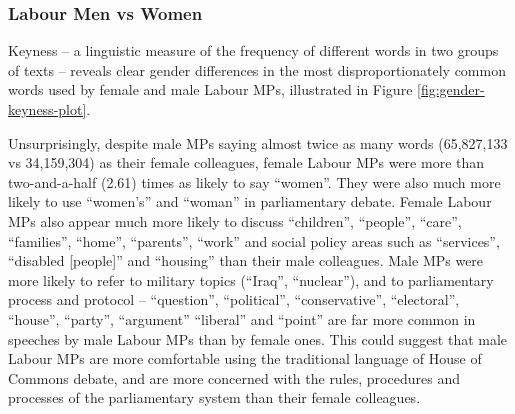 \documentclass[]{article}
\theoremstyle{definition}
\theoremstyle{definition}
\theoremstyle{definition}
\theoremstyle{remark}
\begin{document}
\hypertarget{labour-men-vs-women}{%
\subsubsection{Labour Men vs Women}\label{labour-men-vs-women}}

Keyness -- a linguistic measure of the frequency of different words in
two groups of texts -- reveals clear gender differences in the most
disproportionately common words used by female and male Labour MPs,
illustrated in Figure \ref{fig:gender-keyness-plot}.

Unsurprisingly, despite male MPs saying almost twice as many words
(65,827,133 vs 34,159,304) as their female colleagues, female Labour MPs
were more than two-and-a-half (2.61) times as likely to say ``women''.
They were also much more likely to use ``women's'' and ``woman'' in
parliamentary debate. Female Labour MPs also appear much more likely to
discuss ``children'', ``people'', ``care'', ``families'', ``home'',
``parents'', ``work'' and social policy areas such as ``services'',
``disabled {[}people{]}'' and ``housing'' than their male colleagues.
Male MPs were more likely to refer to military topics (``Iraq'',
``nuclear''), and to parliamentary process and protocol -- ``question'',
``political'', ``conservative'', ``electoral'', ``house'', ``party'',
``argument'' ``liberal'' and ``point'' are far more common in speeches
by male Labour MPs than by female ones. This could suggest that male
Labour MPs are more comfortable using the traditional language of House
of Commons debate, and are more concerned with the rules, procedures and
processes of the parliamentary system than their female colleagues.
\end{document}
